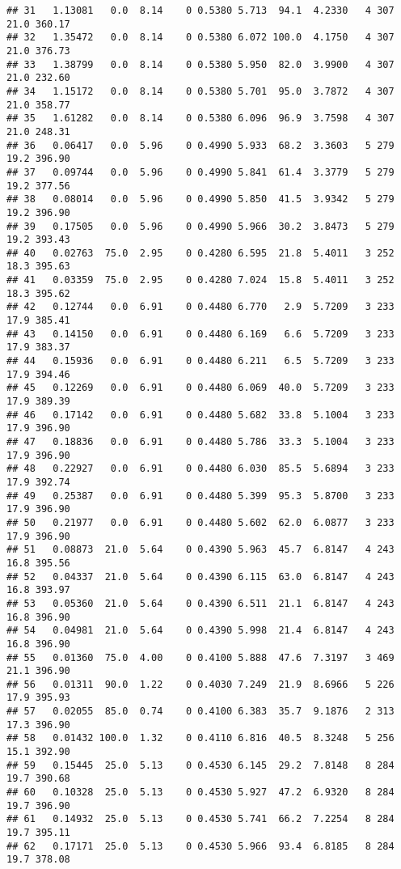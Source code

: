 \documentclass[
]{article}
\begin{document}
\begin{verbatim}
## 31   1.13081   0.0  8.14    0 0.5380 5.713  94.1  4.2330   4 307    21.0 360.17
## 32   1.35472   0.0  8.14    0 0.5380 6.072 100.0  4.1750   4 307    21.0 376.73
## 33   1.38799   0.0  8.14    0 0.5380 5.950  82.0  3.9900   4 307    21.0 232.60
## 34   1.15172   0.0  8.14    0 0.5380 5.701  95.0  3.7872   4 307    21.0 358.77
## 35   1.61282   0.0  8.14    0 0.5380 6.096  96.9  3.7598   4 307    21.0 248.31
## 36   0.06417   0.0  5.96    0 0.4990 5.933  68.2  3.3603   5 279    19.2 396.90
## 37   0.09744   0.0  5.96    0 0.4990 5.841  61.4  3.3779   5 279    19.2 377.56
## 38   0.08014   0.0  5.96    0 0.4990 5.850  41.5  3.9342   5 279    19.2 396.90
## 39   0.17505   0.0  5.96    0 0.4990 5.966  30.2  3.8473   5 279    19.2 393.43
## 40   0.02763  75.0  2.95    0 0.4280 6.595  21.8  5.4011   3 252    18.3 395.63
## 41   0.03359  75.0  2.95    0 0.4280 7.024  15.8  5.4011   3 252    18.3 395.62
## 42   0.12744   0.0  6.91    0 0.4480 6.770   2.9  5.7209   3 233    17.9 385.41
## 43   0.14150   0.0  6.91    0 0.4480 6.169   6.6  5.7209   3 233    17.9 383.37
## 44   0.15936   0.0  6.91    0 0.4480 6.211   6.5  5.7209   3 233    17.9 394.46
## 45   0.12269   0.0  6.91    0 0.4480 6.069  40.0  5.7209   3 233    17.9 389.39
## 46   0.17142   0.0  6.91    0 0.4480 5.682  33.8  5.1004   3 233    17.9 396.90
## 47   0.18836   0.0  6.91    0 0.4480 5.786  33.3  5.1004   3 233    17.9 396.90
## 48   0.22927   0.0  6.91    0 0.4480 6.030  85.5  5.6894   3 233    17.9 392.74
## 49   0.25387   0.0  6.91    0 0.4480 5.399  95.3  5.8700   3 233    17.9 396.90
## 50   0.21977   0.0  6.91    0 0.4480 5.602  62.0  6.0877   3 233    17.9 396.90
## 51   0.08873  21.0  5.64    0 0.4390 5.963  45.7  6.8147   4 243    16.8 395.56
## 52   0.04337  21.0  5.64    0 0.4390 6.115  63.0  6.8147   4 243    16.8 393.97
## 53   0.05360  21.0  5.64    0 0.4390 6.511  21.1  6.8147   4 243    16.8 396.90
## 54   0.04981  21.0  5.64    0 0.4390 5.998  21.4  6.8147   4 243    16.8 396.90
## 55   0.01360  75.0  4.00    0 0.4100 5.888  47.6  7.3197   3 469    21.1 396.90
## 56   0.01311  90.0  1.22    0 0.4030 7.249  21.9  8.6966   5 226    17.9 395.93
## 57   0.02055  85.0  0.74    0 0.4100 6.383  35.7  9.1876   2 313    17.3 396.90
## 58   0.01432 100.0  1.32    0 0.4110 6.816  40.5  8.3248   5 256    15.1 392.90
## 59   0.15445  25.0  5.13    0 0.4530 6.145  29.2  7.8148   8 284    19.7 390.68
## 60   0.10328  25.0  5.13    0 0.4530 5.927  47.2  6.9320   8 284    19.7 396.90
## 61   0.14932  25.0  5.13    0 0.4530 5.741  66.2  7.2254   8 284    19.7 395.11
## 62   0.17171  25.0  5.13    0 0.4530 5.966  93.4  6.8185   8 284    19.7 378.08

\end{verbatim}
\end{document}
